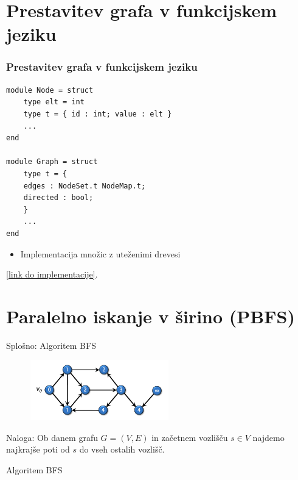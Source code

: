 \documentclass{beamer}
\begin{document}
\section{Prestavitev grafa v funkcijskem jeziku}

\begin{frame}[fragile]
    \frametitle{Prestavitev grafa v funkcijskem jeziku}
\begin{verbatim}
module Node = struct
    type elt = int
    type t = { id : int; value : elt }
    ...
end

module Graph = struct
    type t = {
    edges : NodeSet.t NodeMap.t;
    directed : bool;
    }
    ...
end
    \end{verbatim}
    \begin{itemize}
      \item Implementacija množic z uteženimi drevesi
    \end{itemize}
        
    \href{https://github.com/tjazerzen/parallelisation-of-graph-algorithms-in-functional-programming-languages/blob/master/playground/graph/graph.ml}{[link do implementacije]}.
\end{frame}

\section{Paralelno iskanje v širino (PBFS)}

\begin{frame}{Splošno: Algoritem BFS}
    \begin{figure}
        \centering
        \includegraphics[width=6cm]{slike/parallel_bfs/pbfs_graph_example.png}
        \label{fig:pbfs_graph_example}
    \end{figure}
    Naloga: Ob danem grafu $G=(V, E)$ in začetnem vozlišču $s \in V$ najdemo najkrajše poti od $s$ do vseh ostalih vozlišč.
\end{frame}

\begin{frame}{Algoritem BFS}
    \begin{algorithm}[H]
      \SetAlgoLined
      \DontPrintSemicolon
      \label{alg:non_parallel_bfs}
    \end{algorithm}
  \end{frame}
  
\end{document}
